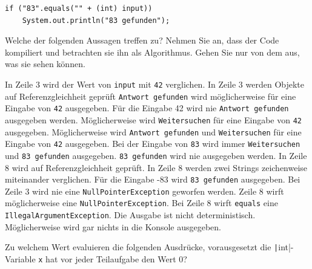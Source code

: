 \documentclass[11pt]{exam} %
\newcommand{\code}[1]{\texttt|#1|}
\newcommand{\fillinline}[1]{\ifprintanswers\fillin[\code{#1}][3cm]\fi\xrfill[-1pt]{0.2mm}}
\begin{document}
\begin{questions}
\begin{verbatim}
if ("83".equals("" + (int) input))
	System.out.println("83 gefunden");
\end{verbatim}
Welche der folgenden Aussagen treffen zu? Nehmen Sie an, dass der Code kompiliert und betrachten sie ihn als Algorithmus. Gehen Sie nur von dem aus, was sie sehen können. 
\begin{checkboxes}
\choice In Zeile 3 wird der Wert von \texttt{input} mit \texttt{42} verglichen.
\CorrectChoice In Zeile 3 werden Objekte auf Referenzgleichheit geprüft
\CorrectChoice \texttt{Antwort gefunden} wird möglicherweise für eine Eingabe von \texttt{42} ausgegeben.
\choice Für die Eingabe 42 wird nie \texttt{Antwort gefunden} ausgegeben werden.
\CorrectChoice Möglicherweise wird \texttt{Weitersuchen} für eine Eingabe von \texttt{42} ausgegeben.
\choice Möglicherweise wird \texttt{Antwort gefunden} und \texttt{Weitersuchen} für eine Eingabe von \texttt{42} ausgegeben.
\CorrectChoice Bei der Eingabe von \texttt{83} wird immer \texttt{Weitersuchen} und \texttt{83 gefunden} ausgegeben.
\choice \texttt{83 gefunden} wird nie ausgegeben werden.
\choice In Zeile 8 wird auf Referenzgleichheit geprüft.
\CorrectChoice In Zeile 8 werden zwei Strings zeichenweise miteinander verglichen.
\choice Für die Eingabe -83 wird \texttt{83 gefunden} ausgegeben.
\CorrectChoice Bei Zeile 3 wird nie eine \texttt{NullPointerException} geworfen werden.
\CorrectChoice Zeile 8 wirft möglicherweise eine \texttt{NullPointerException}.
\choice Bei Zeile 8 wirft \texttt{equals} eine \texttt{IllegalArgumentException}.
\choice Die Ausgabe ist nicht deterministisch.
\CorrectChoice Möglicherweise wird gar nichts in die Konsole ausgegeben.
\end{checkboxes}
\question Zu welchem Wert evaluieren die folgenden Ausdrücke, vorausgesetzt die \code{int}-Variable \texttt{x} hat vor jeder Teilaufgabe den Wert 0?
\end{questions}
\end{document}
